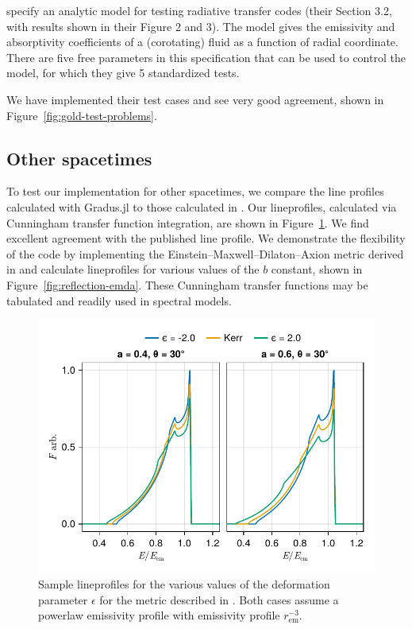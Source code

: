 \documentclass[fleqn,usenatbib]{mnras}
\newcommand{\software}[1]{{\sc #1}}
\newcommand{\Gradus}{\software{Gradus.jl}\xspace}
\newcommand{\rhoem}{r_\text{em}}
\begin{document}
\cite{gold_verification_2020} specify an analytic model for testing radiative
transfer codes (their Section 3.2, with results shown in their Figure 2 and 3).
The model gives the emissivity and absorptivity coefficients of a (corotating)
fluid as a function of radial coordinate. There are five free parameters in this
specification that can be used to control the model, for which they give 5
standardized tests.

We have implemented their test cases and see very good agreement, shown in
Figure~\ref{fig:gold-test-problems}.

\subsection{Other spacetimes}

To test our implementation for other spacetimes, we compare the line
profiles calculated with \Gradus to those calculated in
\citet{johannsen_testing_2013}. Our lineprofiles, calculated via Cunningham
transfer function integration, are shown in
Figure~\ref{fig:reflection-johannsen}. We find excellent agreement with the
published line profile. We demonstrate the flexibility of the code by
implementing the Einstein--Maxwell--Dilaton--Axion metric derived in
\citet{garcia_class_1995} and calculate lineprofiles for various values of the
$b$ constant, shown in Figure~\ref{fig:reflection-emda}. These Cunningham
transfer functions may be tabulated and readily used in spectral models.

\begin{figure}
    \centering
    \includegraphics[width=0.99\columnwidth]{figures/lineprofiles.johannsen-comparison.pdf}
    \caption{Sample lineprofiles for the various values of the deformation
    parameter $\epsilon$ for the metric described in
    \citet{johannsen_testing_2013}. Both cases assume a powerlaw emissivity profile
    with emissivity profile $\rhoem^{-3}$.}
    \label{fig:reflection-johannsen}
\end{figure}
\end{document}
